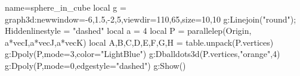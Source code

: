 \documentclass[12pt]{standalone}
\begin{document}
\begin{luadraw}{name=sphere_in_cube}
local g = graph3d:new{window={-6,1.5,-2,5},viewdir={110,65},size={10,10}}
g:Linejoin("round"); Hiddenlinestyle = "dashed"
local a = 4
local P = parallelep(Origin, a*vecI,a*vecJ,a*vecK)
local A,B,C,D,E,F,G,H = table.unpack(P.vertices)
g:Dpoly(P,{mode=3,color="LightBlue"})
g:Dballdots3d(P.vertices,"orange",4)
g:Dpoly(P,{mode=0,edgestyle="dashed"})
g:Show()
\end{luadraw}
\end{document}
